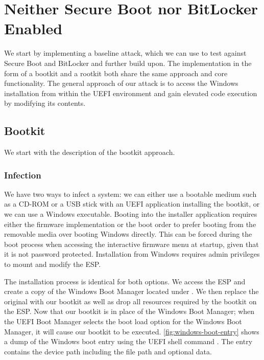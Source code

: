
\section{Neither Secure Boot nor BitLocker Enabled}
\label{sec:attacks:neither}

We start by implementing a baseline attack, which we can use to test against Secure Boot and BitLocker and further build upon.
The implementation in the form of a bootkit and a rootkit both share the same approach and core functionality.
The general approach of our attack is to access the Windows installation from within the \ac{UEFI} environment and gain elevated code execution by modifying its contents.

\subsection{Bootkit}
\label{sec:attacks:neither:bootkit}

We start with the description of the bootkit approach.

\subsubsection{Infection}

We have two ways to infect a system: we can either use a bootable medium such as a CD-ROM or a \ac{USB} stick with an \ac{UEFI} application installing the bootkit, or we can use a Windows executable.
Booting into the installer application requires either the firmware implementation or the boot order to prefer booting from the removable media over booting Windows directly.
This can be forced during the boot process when accessing the interactive firmware menu at startup, given that it is not password protected.
Installation from Windows requires admin privileges to mount and modify the \ac{ESP}.

The installation process is identical for both options.
We access the \ac{ESP} and create a copy of the Windows Boot Manager located under .
We then replace the original with our bootkit as well as drop all resources required by the bootkit on the \ac{ESP}.
Now that our bootkit is in place of the Windows Boot Manager; when the \ac{UEFI} Boot Manager selects the boot load option for the Windows Boot Manager, it will cause our bootkit to be executed.
\autoref{fig:windows-boot-entry} shows a dump of the Windows boot entry using the \ac{UEFI} shell command .
The entry contains the device path including the file path and optional data.

